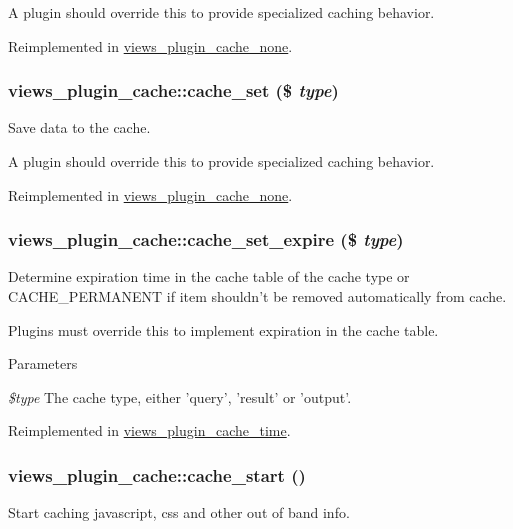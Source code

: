 A plugin should override this to provide specialized caching behavior. 

Reimplemented in \hyperlink{classviews__plugin__cache__none_a8c0a82cd971ea8abc1045107726a3f1d}{views\_\-plugin\_\-cache\_\-none}.\hypertarget{classviews__plugin__cache_a4089f1652603b3e1012a8b0f00407c05}{
\subsubsection[{cache\_\-set}]{\setlength{\rightskip}{0pt plus 5cm}views\_\-plugin\_\-cache::cache\_\-set (\$ {\em type})}}
\label{classviews__plugin__cache_a4089f1652603b3e1012a8b0f00407c05}
Save data to the cache.

A plugin should override this to provide specialized caching behavior. 

Reimplemented in \hyperlink{classviews__plugin__cache__none_a0c66f7c812356a9327ec968c7de6dc47}{views\_\-plugin\_\-cache\_\-none}.\hypertarget{classviews__plugin__cache_a1b96b0d016d91c5885592d3eaf1c8fca}{
\subsubsection[{cache\_\-set\_\-expire}]{\setlength{\rightskip}{0pt plus 5cm}views\_\-plugin\_\-cache::cache\_\-set\_\-expire (\$ {\em type})}}
\label{classviews__plugin__cache_a1b96b0d016d91c5885592d3eaf1c8fca}
Determine expiration time in the cache table of the cache type or CACHE\_\-PERMANENT if item shouldn't be removed automatically from cache.

Plugins must override this to implement expiration in the cache table.


\begin{DoxyParams}{Parameters}
\item[{\em \$type}]The cache type, either 'query', 'result' or 'output'. \end{DoxyParams}


Reimplemented in \hyperlink{classviews__plugin__cache__time_ab816b7a602e3225387b41c0e7950a54c}{views\_\-plugin\_\-cache\_\-time}.\hypertarget{classviews__plugin__cache_aa59c91a728401e1a49857346ae665ce7}{
\subsubsection[{cache\_\-start}]{\setlength{\rightskip}{0pt plus 5cm}views\_\-plugin\_\-cache::cache\_\-start ()}}
\label{classviews__plugin__cache_aa59c91a728401e1a49857346ae665ce7}
Start caching javascript, css and other out of band info.

